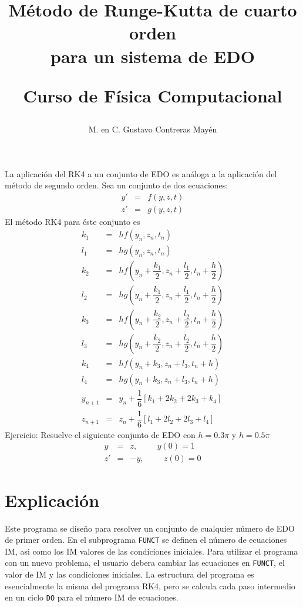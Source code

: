 \documentclass[12pt]{article}
\title{Método de Runge-Kutta de cuarto orden \\ para un sistema de EDO \\ \begin{large}Curso de Física Computacional\end{large}}
\author{M. en C. Gustavo Contreras Mayén}
\date{ }
\begin{document}
\maketitle
La aplicación del RK4 a un conjunto de EDO es análoga a la aplicación del método de segundo orden. Sea un conjunto de dos ecuaciones:
\begin{eqnarray*}
y' & = & f(y,z,t) \\
z' & = & g(y,z,t) 
\end{eqnarray*}
El método RK4 para éste conjunto es
\begin{eqnarray*}
k_{1} & = & h f(y_{n}, z_{n}, t_{n}) \\
l_{1} & = & h g(y_{n}, z_{n}, t_{n}) \\
k_{2} & = & h f \left(y_{n}+ \dfrac{k_{1}}{2}, z_{n}+\dfrac{l_{1}}{2},t_{n}+\dfrac{h}{2} \right) \\
l_{2} & = & h g \left(y_{n}+ \dfrac{k_{1}}{2}, z_{n}+\dfrac{l_{1}}{2},t_{n}+\dfrac{h}{2} \right) \\
k_{3} & = & h f \left(y_{n}+ \dfrac{k_{2}}{2}, z_{n}+\dfrac{l_{2}}{2},t_{n}+\dfrac{h}{2} \right) \\
l_{3} & = & h g \left(y_{n}+ \dfrac{k_{2}}{2}, z_{n}+\dfrac{l_{2}}{2},t_{n}+\dfrac{h}{2} \right) \\
k_{4} & = & h f (y_{n} + k_{3}, z_{n} + l_{3}, t_{n} + h) \\
l_{4} & = & h g (y_{n} + k_{3}, z_{n} + l_{3}, t_{n} + h) \\
y_{n+1} & = & y_{n} + \dfrac{1}{6} [k_{1} + 2 k_{2} + 2k_{3} + k_{4} ] \\
z_{n+1} & = & z_{n} + \dfrac{1}{6} [l_{1} + 2 l_{2} + 2l_{3} + l_{4} ]
\end{eqnarray*}
Ejercicio: Resuelve el siguiente conjunto de EDO con $h=0.3 \pi$ y $h=0.5 \pi$
\begin{eqnarray*}
 y & = & z, \hspace{1cm} y(0) = 1\\
 z' & = & -y, \hspace{1cm} z(0) = 0
\end{eqnarray*}
\section{Explicación}
Este programa se diseño para resolver un conjunto de cualquier número de EDO de primer orden. En el subprograma \texttt{FUNCT} se definen el número de ecuaciones IM, asi como los IM valores de las condiciones iniciales. Para utilizar el programa con un nuevo problema, el usuario debera cambiar las ecuaciones en \texttt{FUNCT}, el valor de IM y las condiciones iniciales. La estructura del programa es esencialmente la misma del programa RK4, pero se calcula cada paso intermedio en un ciclo \texttt{DO} para el número IM de ecuaciones.
\end{document}
